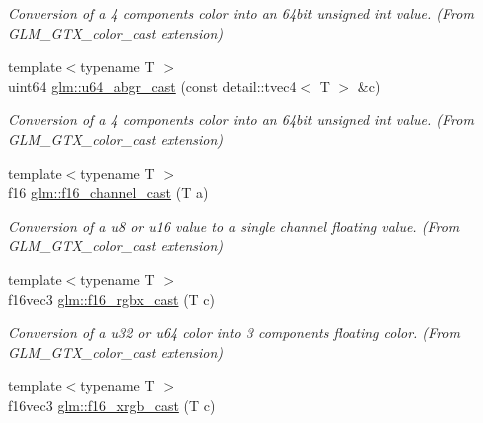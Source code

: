 \begin{DoxyCompactItemize}
\begin{DoxyCompactList}\small\item\em Conversion of a 4 components color into an 64bit unsigned int value. (From G\+L\+M\+\_\+\+G\+T\+X\+\_\+color\+\_\+cast extension) \end{DoxyCompactList}\item 
\hypertarget{group__gtx__color__cast_gad8850bb162df4df64541cae10e693642}{}{\footnotesize template$<$typename T $>$ }\\uint64 \hyperlink{group__gtx__color__cast_gad8850bb162df4df64541cae10e693642}{glm\+::u64\+\_\+abgr\+\_\+cast} (const detail\+::tvec4$<$ T $>$ \&c)\label{group__gtx__color__cast_gad8850bb162df4df64541cae10e693642}

\begin{DoxyCompactList}\small\item\em Conversion of a 4 components color into an 64bit unsigned int value. (From G\+L\+M\+\_\+\+G\+T\+X\+\_\+color\+\_\+cast extension) \end{DoxyCompactList}\item 
\hypertarget{group__gtx__color__cast_gaaed10c22c6d3ae8400f6a27b95748bb9}{}{\footnotesize template$<$typename T $>$ }\\f16 \hyperlink{group__gtx__color__cast_gaaed10c22c6d3ae8400f6a27b95748bb9}{glm\+::f16\+\_\+channel\+\_\+cast} (T a)\label{group__gtx__color__cast_gaaed10c22c6d3ae8400f6a27b95748bb9}

\begin{DoxyCompactList}\small\item\em Conversion of a u8 or u16 value to a single channel floating value. (From G\+L\+M\+\_\+\+G\+T\+X\+\_\+color\+\_\+cast extension) \end{DoxyCompactList}\item 
\hypertarget{group__gtx__color__cast_gaf17e45ee1f5602b86df9f32c5c28234f}{}{\footnotesize template$<$typename T $>$ }\\f16vec3 \hyperlink{group__gtx__color__cast_gaf17e45ee1f5602b86df9f32c5c28234f}{glm\+::f16\+\_\+rgbx\+\_\+cast} (T c)\label{group__gtx__color__cast_gaf17e45ee1f5602b86df9f32c5c28234f}

\begin{DoxyCompactList}\small\item\em Conversion of a u32 or u64 color into 3 components floating color. (From G\+L\+M\+\_\+\+G\+T\+X\+\_\+color\+\_\+cast extension) \end{DoxyCompactList}\item 
\hypertarget{group__gtx__color__cast_gaa34ca9eb33fc570d84affe75970ad472}{}{\footnotesize template$<$typename T $>$ }\\f16vec3 \hyperlink{group__gtx__color__cast_gaa34ca9eb33fc570d84affe75970ad472}{glm\+::f16\+\_\+xrgb\+\_\+cast} (T c)\label{group__gtx__color__cast_gaa34ca9eb33fc570d84affe75970ad472}


\end{DoxyCompactItemize}
